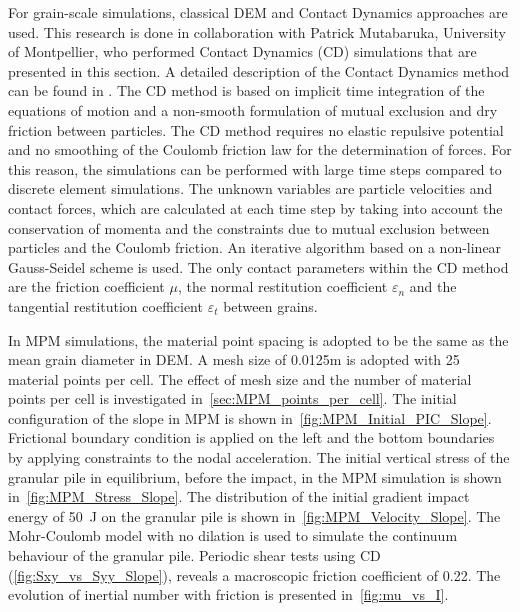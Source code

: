 For grain-scale simulations, classical DEM and Contact Dynamics approaches are 
used. This research is done in collaboration with Patrick Mutabaruka, 
University of Montpellier, who performed Contact Dynamics (CD) simulations that 
are 
presented in this section. A detailed description of the Contact Dynamics 
method can be found in \cite{Moreau1993,Jean1999,Radjai2009,Radjai2011}. 
The CD method is based on implicit time integration of the equations of motion 
and a non-smooth formulation of mutual exclusion and dry friction between 
particles. The CD method requires no elastic repulsive potential and no 
smoothing of the Coulomb friction law for the determination of forces. 
For this reason, the simulations can be performed with large time steps 
compared to discrete element simulations. The unknown variables are particle 
velocities and contact forces, which are calculated at each time step by taking 
into account the conservation of momenta and the constraints due to mutual 
exclusion between particles and the Coulomb friction. An iterative 
algorithm based on a non-linear Gauss-Seidel scheme is used. The only 
contact 
parameters within the CD method are the friction coefficient $\mu$, the 
normal restitution coefficient $\varepsilon_n$ and the tangential restitution 
coefficient $\varepsilon_t$ between grains. 

In MPM simulations, the material point spacing is adopted to be the same as the 
mean grain diameter in DEM. A mesh size of 0.0125m is adopted with 25 material 
points per cell. The effect of mesh size and the number of material points per 
cell is investigated in~\cref{sec:MPM_points_per_cell}. The initial 
configuration of the slope in MPM is shown in~\cref{fig:MPM_Initial_PIC_Slope}. 
Frictional boundary condition is applied on the left and the bottom boundaries 
by applying constraints to the nodal acceleration. The initial vertical stress 
of the granular pile in equilibrium, before the impact, in the MPM simulation 
is shown in~\cref{fig:MPM_Stress_Slope}. The distribution of the initial 
gradient impact energy of 50~\si{J} on the granular pile is shown 
in~\cref{fig:MPM_Velocity_Slope}. The Mohr-Coulomb model 
with no dilation is used to simulate the continuum behaviour of the granular 
pile. Periodic shear tests using CD (\cref{fig:Sxy_vs_Syy_Slope}), reveals a 
macroscopic friction coefficient of 0.22. The evolution of inertial number with 
friction is presented in~\cref{fig:mu_vs_I}. 

